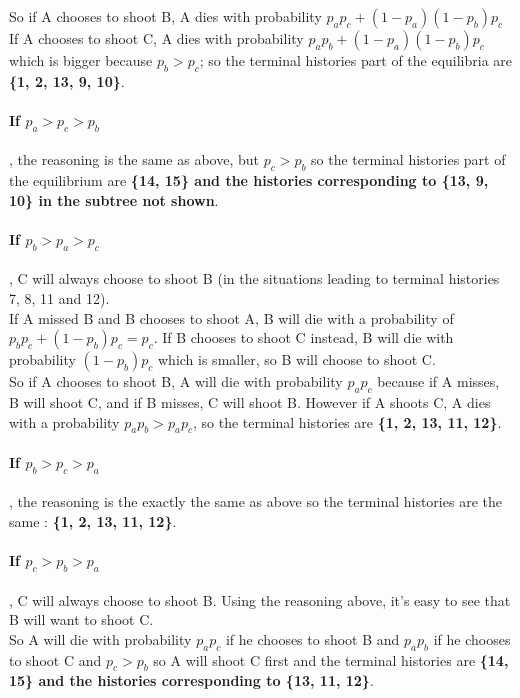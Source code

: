 \documentclass[a4paper]{article}
\begin{document}
So if A chooses to shoot B, A dies with probability 
$p_ap_c + (1-p_a)(1-p_b)p_c$\\

If A chooses to shoot C, A dies with probability $p_ap_b + (1-p_a)(1-p_b)p_c$
which is bigger because $p_b > p_c$; so the terminal histories part of the 
equilibria are \textbf{\{1, 2, 13, 9, 10\}}.

\paragraph{If $p_a > p_c > p_b$}, the reasoning is the same as above, but 
$p_c>p_b$ so the terminal histories part of the equilibrium are \textbf{\{14,
15\} and the histories corresponding to \{13, 9, 10\} in the subtree not shown}.

\paragraph{If $p_b > p_a > p_c$}, C will always choose to shoot B (in the
situations leading to terminal histories 7, 8, 11 and 12).\\

If A missed B and B chooses to shoot A, B will die with a probability of 
$p_bp_c + (1-p_b)p_c = p_c$. If B chooses to shoot C instead, B will die with
probability $(1-p_b)p_c$ which is smaller, so B will choose to shoot C.\\

So if A chooses to shoot B, A will die with probability $p_ap_c$ because if A
misses, B will shoot C, and if B misses, C will shoot B. However if A shoots C,
A dies with a probability $p_ap_b > p_ap_c$, so the terminal histories are 
\textbf{{\{1, 2, 13, 11, 12\}}}.

\paragraph{If $p_b > p_c > p_a$}, the reasoning is the exactly the same as 
above so the terminal histories are the same : \textbf{{\{1, 2, 13, 11, 12\}}}.

\paragraph{If $p_c > p_b > p_a$}, C will always choose to shoot B. Using the
reasoning above, it's easy to see that B will want to shoot C.\\

So A will die with probability $p_ap_c$ if he chooses to shoot B and $p_ap_b$
if he chooses to shoot C and $p_c>p_b$ so A will shoot C first and the terminal
histories are \textbf{\{14, 15\} and the histories corresponding to \{13, 11,
12\}}.
\end{document}
